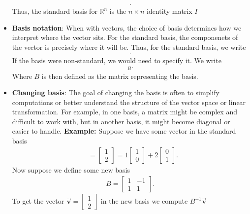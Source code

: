 \documentclass{report}
\begin{document}
\begin{itemize}
\begin{align*}
            .\end{align*}
            \bigbreak \noindent 
            Thus, the standard basis for $\mathbb{R}^{n}$ is the $n\times n$ identity matrix $I$
        \item \textbf{Basis notation}: When with vectors, the choice of basis determines how we interpret where the vector sits. For the standard basis, the componenets of the vector is precisely where it will be. Thus, for the standard basis, we write
            \begin{align*}
                [\vec{\mathbf{v}}]
            .\end{align*}
            If the basis were non-standard, we would need to specify it. We write
            \begin{align*}
                [\vec{\mathbf{v}}]_{B}
            .\end{align*}
            Where $B$ is then defined as the matrix representing the basis.
        \item \textbf{Changing basis}: The goal of changing the basis is often to simplify computations or better understand the structure of the vector space or linear transformation. For example, in one basis, a matrix might be complex and difficult to work with, but in another basis, it might become diagonal or easier to handle.
            \bigbreak \noindent 
            \textbf{Example:} Suppose we have some vector in the standard basis
            \begin{align*}
                [\vec{\mathbf{v}}] &= \begin{bmatrix} 1 \\ 2\end{bmatrix} = 1 \begin{bmatrix} 1 \\ 0\end{bmatrix} + 2 \begin{bmatrix} 0 \\ 1\end{bmatrix}
            .\end{align*}
            Now suppose we define some new basis 
            \begin{align*}
                B = \begin{bmatrix} 1 & -1 \\ 1 & 1\end{bmatrix}
            .\end{align*}
            \bigbreak \noindent 
            To get the vector $ \vec{\mathbf{v}} = \begin{bmatrix} 1 \\ 2\end{bmatrix} $ in the new basis we compute $B^{-1}\vec{\mathbf{v}}$

\end{itemize}
\end{document}
